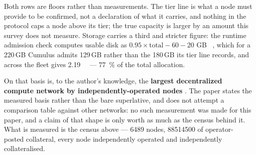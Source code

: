 Both rows are floors rather than measurements. The tier line is what a node must provide to be
confirmed, not a declaration of what it carries, and nothing in the protocol caps a node above its
tier; the true capacity is larger by an amount this survey does not measure. Storage carries a third
and stricter figure: the runtime admission check computes usable disk as
$0.95 \times \text{total} - 60 - 20$ GB
\shipped~,
which for a \num{220}\,GB Cumulus admits \num{129}\,GB rather than the \num{180}\,GB its tier line
records, and across the fleet gives \SI{2.19}{\peta\byte} --- \SI{77}{\percent} of the total
allocation. 

On that basis \Flux{} is, to the author's knowledge, the \textbf{largest decentralized compute
network by independently-operated nodes} . The paper
states the measured basis rather than the bare superlative, and does not attempt a comparison table
against other networks: no such measurement was made for this paper, and a claim of that shape is
only worth as much as the census behind it. What is measured is the census above --- \num{6489}
nodes, \num{88514500}\flux{} of operator-posted collateral, every node independently operated and
independently collateralised.

